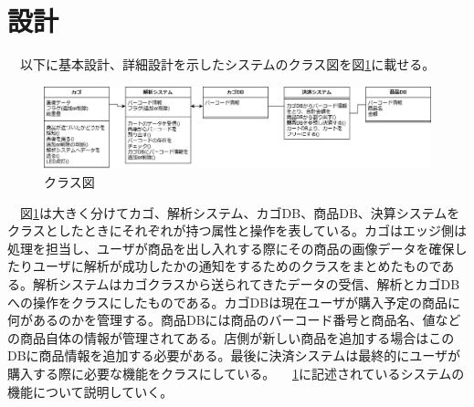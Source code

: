 \section{設計}
　以下に基本設計、詳細設計を示したシステムのクラス図\cite{v_model}を図\ref{class}に載せる。
\begin{figure}[htbp]
\centering
\includegraphics[width=15cm]{./pic/class_final.eps}
\caption{クラス図}
\label{class}
\end{figure}

　図\ref{class}は大きく分けてカゴ、解析システム、カゴDB、商品DB、決算システムをクラスとしたときにそれぞれが持つ属性と操作を表している。カゴはエッジ側は処理を担当し、ユーザが商品を出し入れする際にその商品の画像データを確保したりユーザに解析が成功したかの通知をするためのクラスをまとめたものである。解析システムはカゴクラスから送られてきたデータの受信、解析とカゴDBへの操作をクラスにしたものである。カゴDBは現在ユーザが購入予定の商品に何があるのかを管理する。商品DBには商品のバーコード番号と商品名、値などの商品自体の情報が管理されてある。店側が新しい商品を追加する場合はこのDBに商品情報を追加する必要がある。最後に決済システムは最終的にユーザが購入する際に必要な機能をクラスにしている。
　\ref{class}に記述されているシステムの機能について説明していく。
